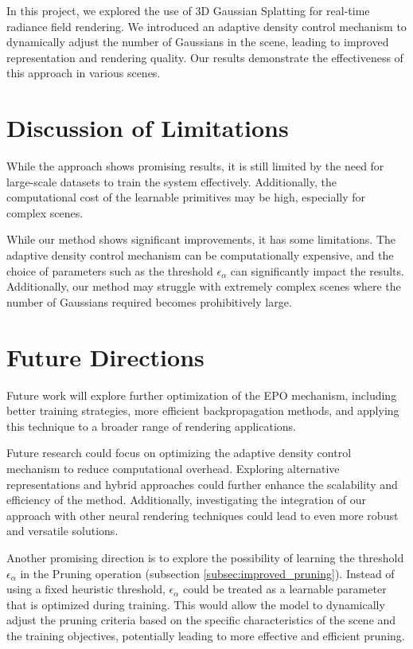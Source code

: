 \documentclass[11pt]{report}
\begin{document}
In this project, we explored the use of 3D Gaussian Splatting for real-time radiance field rendering. We introduced an adaptive density control mechanism to dynamically adjust the number of Gaussians in the scene, leading to improved representation and rendering quality. Our results demonstrate the effectiveness of this approach in various scenes.

\section{Discussion of Limitations}

While the approach shows promising results, it is still limited by the need for large-scale datasets to train the system effectively. Additionally, the computational cost of the learnable primitives may be high, especially for complex scenes.

While our method shows significant improvements, it has some limitations. The adaptive density control mechanism can be computationally expensive, and the choice of parameters such as the threshold $\epsilon_\alpha$ can significantly impact the results. Additionally, our method may struggle with extremely complex scenes where the number of Gaussians required becomes prohibitively large.

\section{Future Directions}

Future work will explore further optimization of the EPO mechanism, including better training strategies, more efficient backpropagation methods, and applying this technique to a broader range of rendering applications.

Future research could focus on optimizing the adaptive density control mechanism to reduce computational overhead. Exploring alternative representations and hybrid approaches could further enhance the scalability and efficiency of the method. Additionally, investigating the integration of our approach with other neural rendering techniques could lead to even more robust and versatile solutions.

Another promising direction is to explore the possibility of learning the threshold $\epsilon_\alpha$ in the Pruning operation (subsection \ref{subsec:improved_pruning}). Instead of using a fixed heuristic threshold, $\epsilon_\alpha$ could be treated as a learnable parameter that is optimized during training. This would allow the model to dynamically adjust the pruning criteria based on the specific characteristics of the scene and the training objectives, potentially leading to more effective and efficient pruning.
\end{document}
